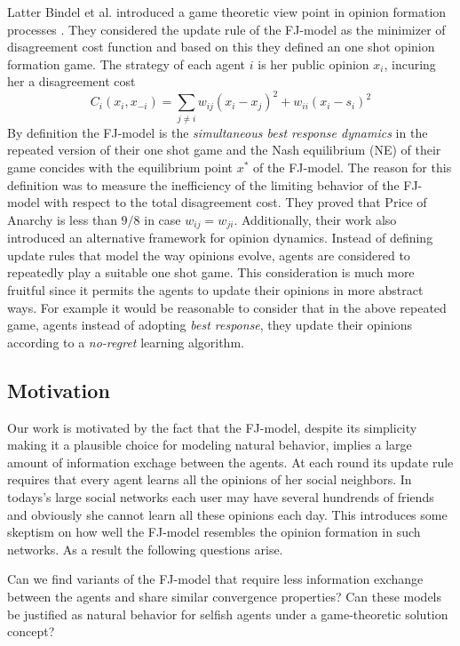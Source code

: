 Latter Bindel et al. introduced a game theoretic
view point in opinion formation processes \cite{BKO11}.
They considered the update rule of the FJ-model
as the minimizer of disagreement cost function
and based on this they defined an one shot
opinion formation game. The strategy of each agent $i$ is
her public opinion $x_i$, incuring her a
disagreement cost
%
\begin{equation}\label{eq:BKO_cost}
  C_i(x_i,x_{-i})=
  \sum_{j \neq i}w_{ij} (x_i-x_j)^2 + w_{ii}(x_i-s_i)^2
\end{equation}
%
By definition the FJ-model is the
\emph{simultaneous best response dynamics} in the repeated
version of their one shot game and the Nash equilibrium (NE)
of their game concides with the equilibrium point
$x^*$ of the FJ-model. The reason for this definition
was to measure the inefficiency of the limiting behavior
of the FJ-model with respect to the total disagreement cost.
They proved that Price of Anarchy is less than $9/8$
in case $w_{ij}=w_{ji}$. Additionally, their work also introduced
an alternative framework for opinion dynamics.
Instead of defining update rules that model the
way opinions evolve, agents are considered to repeatedly
play a suitable one shot game. This consideration is
much more fruitful since it permits the agents to
update their opinions in more abstract ways.
For example it would be reasonable to consider
that in the above repeated game, agents instead of
adopting \emph{best response}, they update their opinions according
to a \emph{no-regret} learning algorithm.

\subsection{Motivation}
Our work is motivated by the fact that the FJ-model,
despite its simplicity making it a plausible choice
for modeling natural behavior, implies a large amount of
information exchage between the agents. At each round
its update rule requires that every agent learns all the
opinions of her social neighbors.
In todays's large social networks each user
may have several hundrends of friends and obviously
she cannot learn all these opinions each day.
This introduces some skeptism on how well the
FJ-model resembles the opinion formation in such
networks. As a result the following questions arise.

\begin{question}
Can we find variants of the FJ-model that
require less information exchange between the agents
and share similar convergence properties?
Can these models be justified as natural behavior for selfish
agents under a game-theoretic solution concept?
\end{question}

